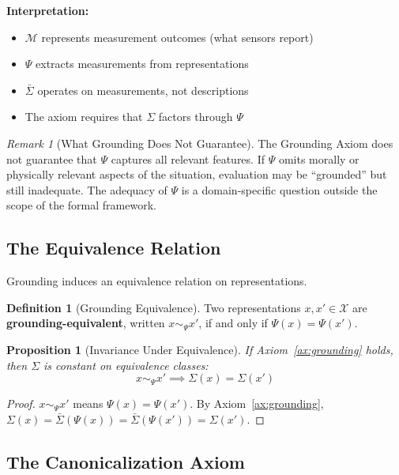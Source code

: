 \documentclass[12pt]{article}
\newtheorem{proposition}[theorem]{Proposition}
\theoremstyle{definition}
\newtheorem{definition}[theorem]{Definition}
\theoremstyle{remark}
\newtheorem{remark}[theorem]{Remark}
\newcommand{\calX}{\mathcal{X}}
\newcommand{\calM}{\mathcal{M}}
\newcommand{\Sigmabar}{\bar{\Sigma}}
\begin{document}
\textbf{Interpretation:}
\begin{itemize}
    \item $\calM$ represents measurement outcomes (what sensors report)
    \item $\Psi$ extracts measurements from representations
    \item $\Sigmabar$ operates on measurements, not descriptions
    \item The axiom requires that $\Sigma$ factors through $\Psi$
\end{itemize}

\begin{remark}[What Grounding Does Not Guarantee]\label{rem:grounding-limit}
The Grounding Axiom does not guarantee that $\Psi$ captures all relevant features. If $\Psi$ omits morally or physically relevant aspects
of the situation, evaluation may be ``grounded'' but still inadequate. The adequacy of $\Psi$ is a
domain-specific question outside the scope of the formal framework.
\end{remark}

\subsection{The Equivalence Relation}

Grounding induces an equivalence relation on representations.

\begin{definition}[Grounding Equivalence]\label{def:grounding-equiv}
Two representations $x, x' \in \calX$ are \textbf{grounding-equivalent}, written $x \sim_\Psi x'$, if and only if $\Psi(x) = \Psi(x')$.
\end{definition}

\begin{proposition}[Invariance Under Equivalence]\label{prop:inv-equiv}
If Axiom~\ref{ax:grounding} holds, then $\Sigma$ is constant on
equivalence classes:
\[
    x \sim_\Psi x' \implies \Sigma(x) = \Sigma(x')
\]
\end{proposition}

\begin{proof}
$x \sim_\Psi x'$ means $\Psi(x) = \Psi(x')$. By Axiom~\ref{ax:grounding}, $\Sigma(x) = \Sigmabar(\Psi(x)) = \Sigmabar(\Psi(x')) = \Sigma(x')$.
\end{proof}

\subsection{The Canonicalization Axiom}
\end{document}
